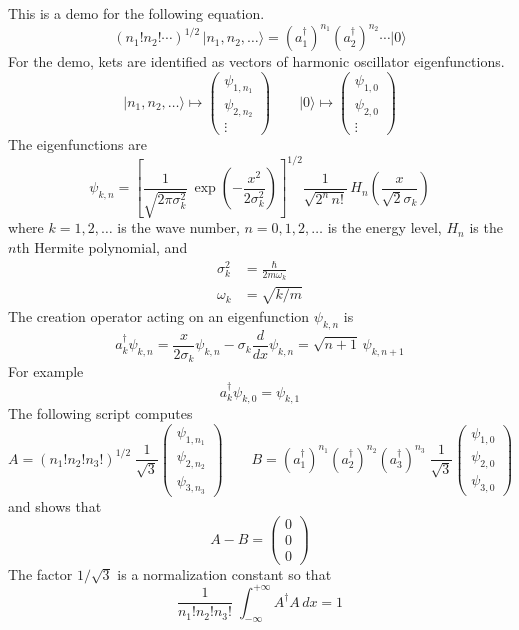 \documentclass[12pt]{article}
\begin{document}
This is a demo for the following equation.
$$
(n_1!n_2!\cdots)^{1/2}\,\vert n_1,n_2,\ldots\rangle
=(a_1^\dag)^{n_1}(a_2^\dag)^{n_2}\cdots\vert0\rangle
$$
For the demo, kets are identified as vectors of harmonic oscillator eigenfunctions.
$$
\vert n_1,n_2,\ldots\rangle\longmapsto
\begin{pmatrix}
\psi_{1,n_1} \\
\psi_{2,n_2} \\
\vdots
\end{pmatrix}
\qquad
\vert 0\rangle\longmapsto
\begin{pmatrix}
\psi_{1,0} \\
\psi_{2,0} \\
\vdots
\end{pmatrix}
$$
The eigenfunctions are
$$
\psi_{k,n}=
\left[
\frac{1}{\sqrt{2\pi\sigma_k^2}}
\,
\exp\left(-\frac{x^2}{2\sigma_k^2}\right)
\right]^{1/2}
%
\frac{1}{\sqrt{2^n\,n!}}
\,
H_n\left(\frac{x}{\sqrt{2}\sigma_k}\right)
$$
where $k=1,2,\ldots$ is the wave number, $n=0,1,2,\ldots$ is the energy level,
$H_n$ is the $n$th Hermite polynomial, and
\begin{align*}
\sigma_k^2&=\frac{\hbar}{2m\omega_k} \\
\omega_k&=\sqrt{k/m}
\end{align*}
The creation operator acting on an eigenfunction $\psi_{k,n}$ is
$$
a_k^\dag\psi_{k,n}=
\frac{x}{2\sigma_k}\psi_{k,n}-\sigma_k\frac{d}{dx}\psi_{k,n}
=\sqrt{n+1}\,\psi_{k,n+1}
$$
For example
$$
a_k^\dag\psi_{k,0}=\psi_{k,1}
$$
The following script computes
$$
A=(n_1!n_2!n_3!)^{1/2}
\;
\frac{1}{\sqrt{3}}
\begin{pmatrix}
\psi_{1,n_1} \\
\psi_{2,n_2} \\
\psi_{3,n_3}
\end{pmatrix}
%
\qquad
%
B=
(a_1^\dag)^{n_1}
(a_2^\dag)^{n_2}
(a_3^\dag)^{n_3}
\;
\frac{1}{\sqrt{3}}
\begin{pmatrix}
\psi_{1,0} \\
\psi_{2,0} \\
\psi_{3,0}
\end{pmatrix}
$$
and shows that
$$
A-B=\begin{pmatrix}0\\0\\0\end{pmatrix}
$$
The factor $1/\sqrt{3}$ is a normalization constant so that
$$
\frac{1}{n_1!n_2!n_3!}
\;
\int_{-\infty}^{+\infty}A^\dag A\,dx=1
$$
\newpage

\end{document}
